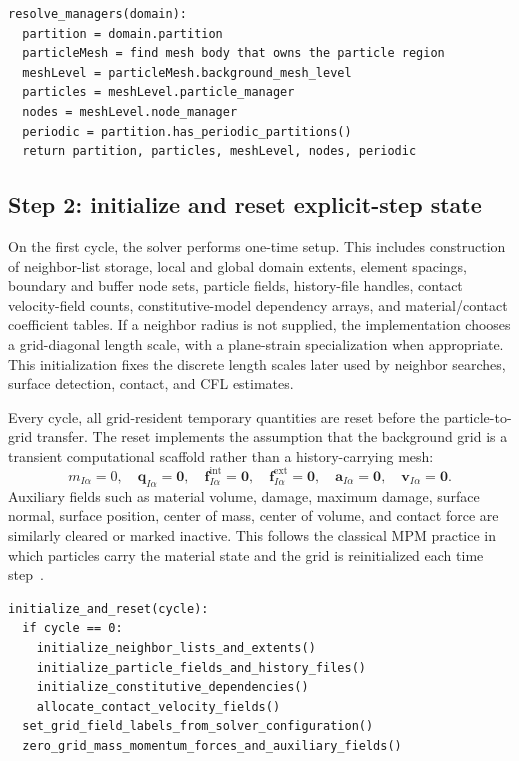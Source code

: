 \begin{lstlisting}[caption={Manager resolution.},basicstyle=\ttfamily\small]
resolve_managers(domain):
  partition = domain.partition
  particleMesh = find mesh body that owns the particle region
  meshLevel = particleMesh.background_mesh_level
  particles = meshLevel.particle_manager
  nodes = meshLevel.node_manager
  periodic = partition.has_periodic_partitions()
  return partition, particles, meshLevel, nodes, periodic
\end{lstlisting}

\subsection{Step 2: initialize and reset explicit-step state}
\label{subsec:solver-step-2}
On the first cycle, the solver performs one-time setup.  This includes construction of neighbor-list storage, local and global domain extents, element spacings, boundary and buffer node sets, particle fields, history-file handles, contact velocity-field counts, constitutive-model dependency arrays, and material/contact coefficient tables.  If a neighbor radius is not supplied, the implementation chooses a grid-diagonal length scale, with a plane-strain specialization when appropriate.  This initialization fixes the discrete length scales later used by neighbor searches, surface detection, contact, and CFL estimates.

Every cycle, all grid-resident temporary quantities are reset before the particle-to-grid transfer.  The reset implements the assumption that the background grid is a transient computational scaffold rather than a history-carrying mesh:
\begin{equation}
  m_{I\alpha}=0,\quad
  \mathbf{q}_{I\alpha}=\mathbf{0},\quad
  \mathbf{f}^{\mathrm{int}}_{I\alpha}=\mathbf{0},\quad
  \mathbf{f}^{\mathrm{ext}}_{I\alpha}=\mathbf{0},\quad
  \mathbf{a}_{I\alpha}=\mathbf{0},\quad
  \mathbf{v}_{I\alpha}=\mathbf{0}.
\end{equation}
Auxiliary fields such as material volume, damage, maximum damage, surface normal, surface position, center of mass, center of volume, and contact force are similarly cleared or marked inactive.  This follows the classical MPM practice in which particles carry the material state and the grid is reinitialized each time step~\cite{sulsky1994history,steffen2008choices}.

\begin{lstlisting}[caption={State reset.},basicstyle=\ttfamily\small]
initialize_and_reset(cycle):
  if cycle == 0:
    initialize_neighbor_lists_and_extents()
    initialize_particle_fields_and_history_files()
    initialize_constitutive_dependencies()
    allocate_contact_velocity_fields()
  set_grid_field_labels_from_solver_configuration()
  zero_grid_mass_momentum_forces_and_auxiliary_fields()
\end{lstlisting}

